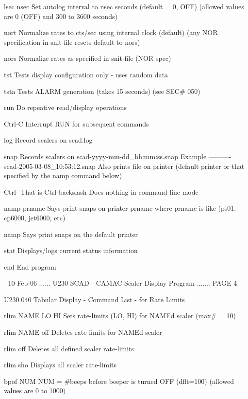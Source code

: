    lsec nsec       Set autolog interval to nsec seconds (default = 0, OFF)
                   (allowed values are 0 (OFF) and 300 to 3600 seconds)
 
   nort            Normalize rates to cts/sec using internal clock (default)
                   (any NOR specification in snit-file resets default to nors)
 
   nors            Normalize rates as specified in snit-file (NOR spec)
 
   tst             Tests display configuration only - uses random data
 
   tsta            Tests ALARM generation (takes 15 seconds) (see SEC# 050)
 
   run             Do repeative read/display operations
 
   Ctrl-C          Interrupt RUN for subsequent commands
 
   log             Record scalers on scad.log
 
   snap            Records scalers on scad-yyyy-mm-dd_hh:mm:ss.snap
                   Example ---------- scad-2005-03-08_10:53:12.snap
                   Also prints file on printer (default printer or that
                   specified by the namp command below)
 
   Ctrl-
                   That is Ctrl-backslash
                   Does nothing in command-line mode
 
   namp prname     Says print snaps on printer prname where
                   prname is like (ps01, cp6000, jet6000, etc)
 
   namp            Says print snaps on the default printer
 
   stat            Displays/logs current status information
 
   end             End program
 
    
   10-Feb-06 ...... U230  SCAD - CAMAC Scaler Display Program ....... PAGE   4
 
 
   U230.040  Tabular Display - Command List - for Rate Limits
 
   rlim NAME LO HI  Sets rate-limits (LO, HI) for NAMEd scaler (max# = 10)
 
   rlim NAME off    Deletes rate-limits for NAMEd scaler
 
   rlim off         Deletes all defined scaler rate-limits
 
   rlim sho         Displays all scaler rate-limits
 
   bpof NUM         NUM = #beeps before beeper is turned OFF  (dflt=100)
                    (allowed values are 0 to 1000)
 
